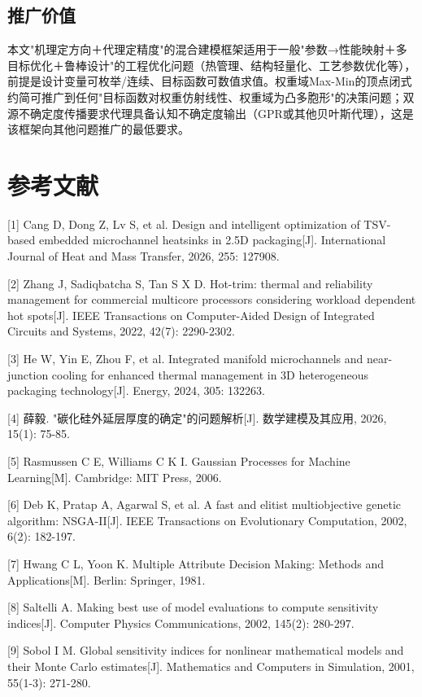 \documentclass[withoutpreface]{cumcmthesis}
\begin{document}
\subsection{推广价值}
本文"机理定方向＋代理定精度"的混合建模框架适用于一般"参数→性能映射＋多目标优化＋鲁棒设计"的工程优化问题（热管理、结构轻量化、工艺参数优化等），前提是设计变量可枚举/连续、目标函数可数值求值。权重域Max-Min的顶点闭式约简可推广到任何"目标函数对权重仿射线性、权重域为凸多胞形"的决策问题；双源不确定度传播要求代理具备认知不确定度输出（GPR或其他贝叶斯代理），这是该框架向其他问题推广的最低要求。

\section{参考文献}
[1] Cang D, Dong Z, Lv S, et al. Design and intelligent optimization of TSV-based embedded microchannel heatsinks in 2.5D packaging[J]. International Journal of Heat and Mass Transfer, 2026, 255: 127908.

[2] Zhang J, Sadiqbatcha S, Tan S X D. Hot-trim: thermal and reliability management for commercial multicore processors considering workload dependent hot spots[J]. IEEE Transactions on Computer-Aided Design of Integrated Circuits and Systems, 2022, 42(7): 2290-2302.

[3] He W, Yin E, Zhou F, et al. Integrated manifold microchannels and near-junction cooling for enhanced thermal management in 3D heterogeneous packaging technology[J]. Energy, 2024, 305: 132263.

[4] 薛毅. "碳化硅外延层厚度的确定"的问题解析[J]. 数学建模及其应用, 2026, 15(1): 75-85.

[5] Rasmussen C E, Williams C K I. Gaussian Processes for Machine Learning[M]. Cambridge: MIT Press, 2006.

[6] Deb K, Pratap A, Agarwal S, et al. A fast and elitist multiobjective genetic algorithm: NSGA-II[J]. IEEE Transactions on Evolutionary Computation, 2002, 6(2): 182-197.

[7] Hwang C L, Yoon K. Multiple Attribute Decision Making: Methods and Applications[M]. Berlin: Springer, 1981.

[8] Saltelli A. Making best use of model evaluations to compute sensitivity indices[J]. Computer Physics Communications, 2002, 145(2): 280-297.

[9] Sobol I M. Global sensitivity indices for nonlinear mathematical models and their Monte Carlo estimates[J]. Mathematics and Computers in Simulation, 2001, 55(1-3): 271-280.
\end{document}
